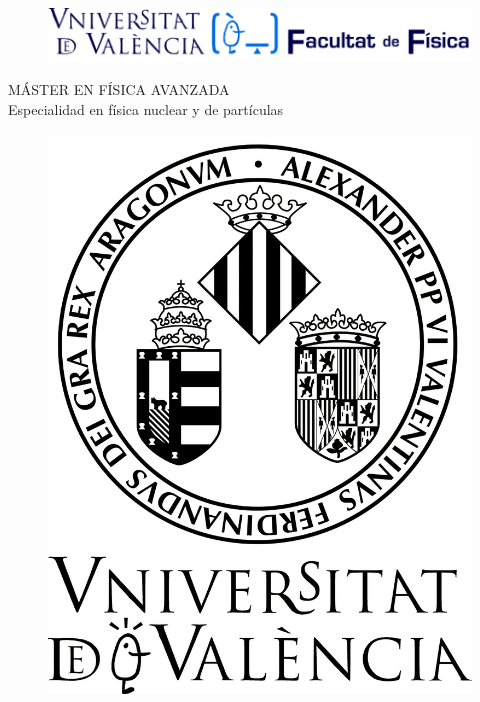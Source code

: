 \documentclass[11pt, a4paper]{article}
\begin{document}
\begin{titlepage}

\begin{center}
\vspace*{-1in}
\vspace*{1 cm}
\begin{figure}[htb]
\begin{center}
\includegraphics[scale=1]{Logo1.png}
\end{center}
\end{figure}
\vspace*{2 cm}


{\large MÁSTER EN FÍSICA AVANZADA}\\
\vspace*{0.2in}
{\huge Especialidad en física nuclear y de partículas}\\
\vspace*{0.2in}
\vspace*{0.6in}
\end{center}
\vspace*{-1in}
\begin{center}

\begin{figure}[htb]
\begin{center}
\includegraphics[scale=0.1]{Logo2.jpg} 
\end{center}
\end{figure}
\vspace*{1 cm}


\end{center}
\end{titlepage}
\end{document}
